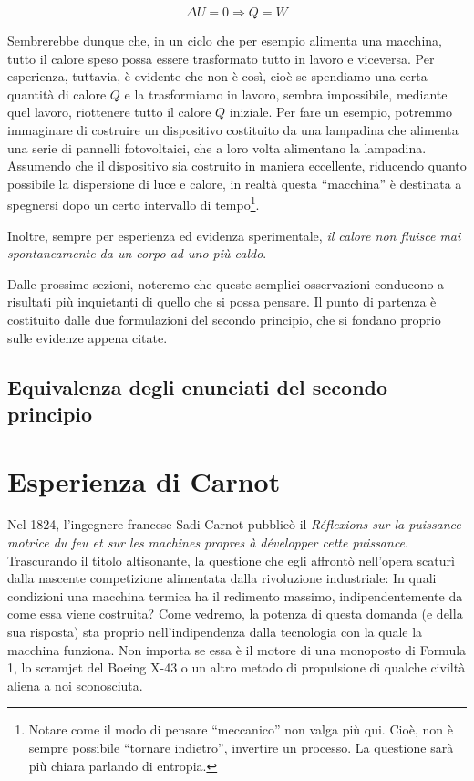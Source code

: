 \[ \Delta U = 0 \Rightarrow Q = W \]

\noindent Sembrerebbe dunque che, in un ciclo che per esempio alimenta
una macchina, tutto il calore speso possa essere trasformato tutto
in lavoro e viceversa. Per esperienza, tuttavia, è evidente che non
è così, cioè se spendiamo una certa quantità di calore $Q$ e
la trasformiamo in lavoro, sembra impossibile, mediante quel lavoro,
riottenere tutto il calore $Q$ iniziale. Per fare un esempio, potremmo
immaginare di costruire un dispositivo costituito da una lampadina che
alimenta una serie di pannelli fotovoltaici, che a loro volta alimentano
la lampadina. Assumendo che il dispositivo sia costruito in maniera
eccellente, riducendo quanto possibile la dispersione di luce e calore,
in realtà questa ``macchina'' è destinata a spegnersi dopo un certo
intervallo di tempo\footnote{Notare come il modo di pensare ``meccanico''
non valga più qui. Cioè, non è sempre possibile ``tornare indietro'', invertire
un processo. La questione sarà più chiara parlando di entropia.}.

Inoltre, sempre per esperienza ed evidenza sperimentale, \textit{il
calore non fluisce mai spontaneamente da un corpo ad uno più caldo}.

Dalle prossime sezioni, noteremo che queste semplici osservazioni
conducono a risultati più inquietanti di quello che si possa
pensare. Il punto di partenza è costituito dalle due formulazioni
del secondo principio, che si fondano proprio sulle evidenze appena
citate.


\subsection{Equivalenza degli enunciati del secondo principio}

\section{Esperienza di Carnot}
Nel 1824, l'ingegnere francese Sadi Carnot pubblicò il
\textit{Réflexions sur la puissance motrice du feu et sur les machines
propres à développer cette puissance}. Trascurando il titolo
altisonante, la questione che egli affrontò nell'opera
scaturì dalla nascente competizione alimentata dalla rivoluzione industriale:
In quali condizioni una macchina termica ha il redimento
massimo, indipendentemente da come essa viene costruita? Come
vedremo, la potenza di questa domanda (e della sua risposta) sta
proprio nell'indipendenza dalla tecnologia con la quale la
macchina funziona. Non importa se essa è il motore di una monoposto
di Formula 1, lo scramjet del Boeing X-43 o un altro metodo di
propulsione di qualche civiltà aliena a noi sconosciuta.

